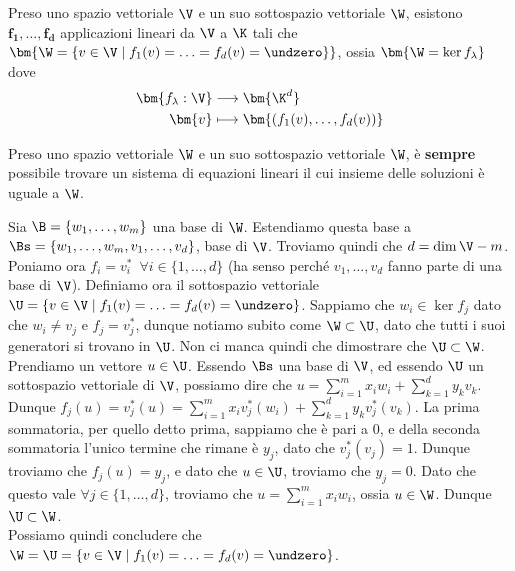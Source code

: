 \documentclass[11pt, a4paper, titlepage, oneside]{scrbook}
\begin{document}
\begin{Definizione}
\label{def-eq-cart-sott}
Preso uno spazio vettoriale $\V$ e un suo sottospazio vettoriale $\W$, esistono $\bm{f_1, \ldots, f_d}$ applicazioni lineari da $\V$ a $\K$ tali che \mbox{$\bm{\W = \{v \in \V \mid f_1(v) = \ldots = f_d(v) = \undzero\}}$}, ossia \mbox{$\bm{\W = \ker f_\lambda}$} dove
\begin{align*}
\bm{f_\lambda: \V} &\longrightarrow \bm{\K^d} \\
\bm{v}  &\longmapsto \bm{(f_1(v), \ldots, f_d(v))}
\end{align*}
\end{Definizione}

\begin{Osservazione}[]
\label{oss-equazioni-cartesiane}
Preso uno spazio vettoriale $\W$ e un suo sottospazio vettoriale $\W$, è \textbf{sempre} possibile trovare un sistema di equazioni lineari il cui insieme delle soluzioni è uguale a $\W$.
\end{Osservazione}

\Dimostrazione \nopagebreak

Sia $\B = \{w_1, \ldots, w_m\}$ una base di $\W$. Estendiamo questa base a \mbox{$\Bs = \{w_1, \ldots, w_m, v_1, \ldots, v_d\}$}, base di $\V$. Troviamo quindi che $d = \dim \V - m$. Poniamo ora $f_i = v_i^* \enspace \forall i \in \{1, \ldots, d\}$ (ha senso perché $v_1, \ldots, v_d$ fanno parte di una base di $\V$). Definiamo ora il sottospazio vettoriale \mbox{$\U = \{v \in \V \mid f_1(v) = \ldots = f_d(v) = \undzero\}$}. Sappiamo che $w_i \in \ker f_j$ dato che $w_i \neq v_j$ e $f_j = v_j^*$, dunque notiamo subito come $\W \subset \U$, dato che tutti i suoi generatori si trovano in $\U$. Non ci manca quindi che dimostrare che $\U \subset \W$. \\
Prendiamo un vettore $u \in \U$. Essendo $\Bs$ una base di $\V$, ed essendo $\U$ un sottospazio vettoriale di $\V$, possiamo dire che $u = \sum_{i = 1}^m x_i w_i + \sum_{k = 1}^d y_k v_k$. Dunque \mbox{$f_j(u) = v_j^*(u) = \sum_{i = 1}^m x_i v_j^*(w_i) + \sum_{k = 1}^d y_k v_j^*(v_k)$}. La prima sommatoria, per quello detto prima, sappiamo che è pari a $0$, e della seconda sommatoria l'unico termine che rimane è $y_j$, dato che $v_j^*(v_j) = 1$. Dunque troviamo che $f_j(u) = y_j$, e dato che $u \in \U$, troviamo che $y_j = 0$. Dato che questo vale $\forall j \in \{1, \ldots, d\}$, troviamo che $u = \sum_{i = 1}^m x_i w_i$, ossia $u \in \W$. Dunque $\U \subset \W$. \\
Possiamo quindi concludere che $\W = \U = \{v \in \V \mid f_1(v)  = \ldots = f_d(v) = \undzero\}$. 
\end{document}
